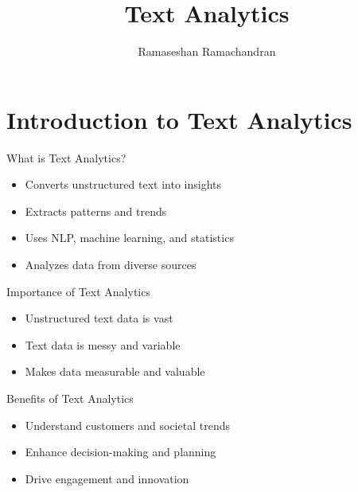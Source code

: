 
\title{Text Analytics}
\author{Ramaseshan Ramachandran}


\frame{\titlepage}

\section{Introduction to Text Analytics}
\begin{frame}{What is Text Analytics?}
\begin{itemize}
    \item Converts unstructured text into insights
    \item Extracts patterns and trends
    \item Uses NLP, machine learning, and statistics
    \item Analyzes data from diverse sources
\end{itemize}
\end{frame}

\begin{frame}{Importance of Text Analytics}
\begin{itemize}
    \item Unstructured text data is vast
    \item Text data is messy and variable
    \item Makes data measurable and valuable
\end{itemize}
\end{frame}

\begin{frame}{Benefits of Text Analytics}
\begin{itemize}
    \item Understand customers and societal trends
    \item Enhance decision-making and planning
    \item Drive engagement and innovation
\end{itemize}
\end{frame}

